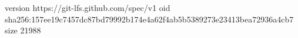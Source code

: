 version https://git-lfs.github.com/spec/v1
oid sha256:157ee19c7457dc87bd79992b174e4a62f4ab5b5389273e23413bea72936a4cb7
size 21988

